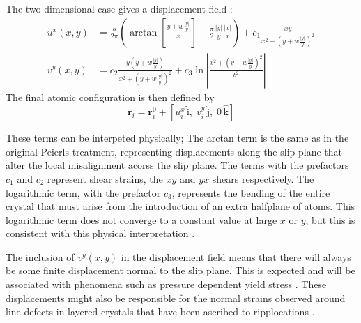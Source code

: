 The two dimensional case gives a displacement field \cite{Eshelby1949,Leibfried1949,nabarro1987theory}:
\begin{subequations}\label{eqn:displacements}
\begin{align}
u^x(x,y) &= \frac{b}{2\pi} \left( \arctan \left[ \frac{y +  w\frac{|y|}{y}}{x} \right] - \frac{\pi}{2} \frac{|y|}{y} \frac{|x|}{x} \right) + c_1 \frac{xy}{x^{2} + (y + w\frac{|y|}{y} )^2} \\
v^y(x,y) &= c_2 \frac{y(y +  w \frac{|y|}{y})}{x^2 + (y +  w \frac{|y|}{y})^2} + c_3 \ln \left| \frac{x^2 + (y +  w \frac{|y|}{y})^2}{b^2} \right|
\end{align}
\label{eqn:displacement_field}
\end{subequations}
The final atomic configuration is then defined by 
\begin{equation}
\bm{r}_i = \bm{r}_i^0 + [u_i^x\,\bm{\mathrm{\hat{i}}},\; v_i^y\,\bm{\mathrm{\hat{j}}},\; 0\,\bm{\mathrm{\hat{k}}}]
\end{equation}

These terms can be interpeted physically; The arctan term is the same as in the original Peierls treatment, representing displacements along the slip plane that alter the local misalignment acorss the slip plane. The terms with the prefactors $c_1$ and $c_2$ represent shear strains, the $xy$ and $yx$ shears respectively. The logarithmic term, with the prefactor $c_3$, represents the bending of the entire crystal that must arise from the introduction of an extra halfplane of atoms. This logarithmic term does not converge to a constant value at large $x$ or $y$, but this is consistent with this physical interpretation \cite{hirth_lothe1982peierls_displacements}.

The inclusion of $v^y(x,y)$ in the displacement field means that there will always be some finite displacement normal to the slip plane. This is expected and will be associated with phenomena such as pressure dependent yield stress \cite{frost1982pressure}. These displacements might also be responsible for the normal strains observed around line defects in layered crystals that have been ascribed to ripplocations \cite{Gruber2016}.




